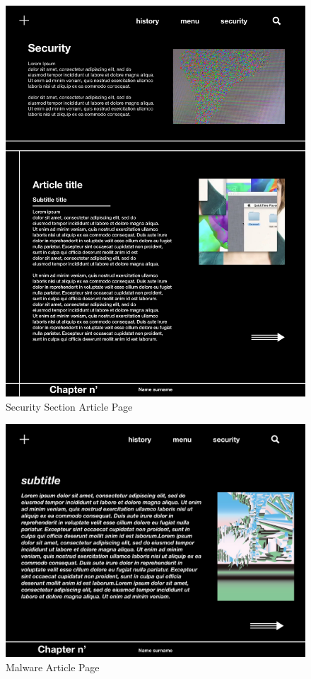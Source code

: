 \documentclass[a4paper,10pt]{article}
\begin{document}
\begin{figure}[p]
\includegraphics[height=0.52\paperheight, center]{security_article_page.jpeg}
\caption{Security Section Article Page}
\end{figure}

\begin{figure}[p]
\includegraphics[height=0.52\paperheight, center]{malware_page.jpeg}
\caption{Malware Article Page}
\end{figure}
\end{document}
